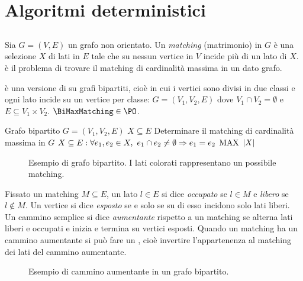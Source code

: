 \chapter{Algoritmi deterministici}



\section{\BiMaxMatching}\label{sec:BiMaxMatching}
Sia $G=(V,E)$ un grafo non orientato. Un \emph{matching} (matrimonio) in $G$ è una selezione $X$ di lati in $E$ tale che su nessun vertice in $V$ incide più di un lato di $X$.
\MaxMatching è il problema di trovare il matching di cardinalità massima in un dato grafo.

\BiMaxMatching è una versione di \MaxMatching su grafi bipartiti, cioè in cui i vertici sono divisi in due classi e ogni lato incide su un vertice per classe: $G=(V_1,V_2,E)$ dove $V_1\cap V_2=\emptyset$ e $E\subseteq V_1\times V_2$. $\BiMaxMatching\in\PO$.

\popt{\BiMaxMatching}
{Grafo bipartito $G=(V_1,V_2,E)$}
{$X\subseteq E$}
{Determinare il matching di cardinalità massima in $G$}
{$X\subseteq E:\forall e_1,e_2\in X,~ e_1\cap e_2\neq\emptyset\Rightarrow e_1=e_2$}
{$\mathrm{MAX}$}
{$| X |$}

\begin{figure}
	\centering
	
	\caption{Esempio di grafo bipartito. I lati colorati rappresentano un possibile matching.}
	\label{fig:graphmatching}
\end{figure}

Fissato un matching $M\subseteq E$, un lato $l\in E$ si dice \emph{occupato} se $l\in M$ e \emph{libero} se $l\notin M$.
Un vertice si dice \emph{esposto} se e solo se su di esso incidono solo lati liberi. Un cammino semplice si dice \emph{aumentante} rispetto a un matching se alterna lati liberi e occupati e inizia e termina su vertici esposti.
Quando un matching ha un cammino aumentante si può fare un , cioè invertire l'appartenenza al matching dei lati del cammino aumentante.

\begin{figure}
	\centering
	\begin{subfigure}[b]{0.4\textwidth}
		\centering
		
	\end{subfigure}
	\begin{subfigure}[b]{0.4\textwidth}
		\centering
		
	\end{subfigure}
	\caption{Esempio di cammino aumentante in un grafo bipartito.}
	\label{fig:augpaths}
\end{figure}

